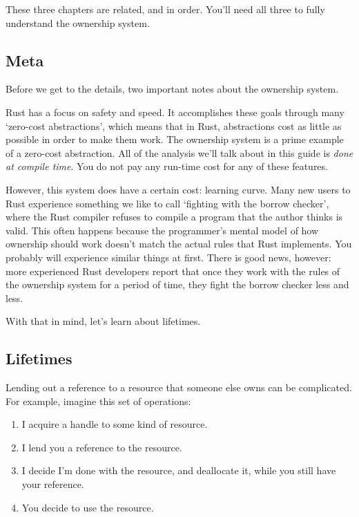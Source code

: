 \documentclass[a4paper,]{book}
\providecommand{\tightlist}{%
  \setlength{\itemsep}{0pt}\setlength{\parskip}{0pt}}
\begin{document}
These three chapters are related, and in order. You'll need all three to
fully understand the ownership system.

\subsection{Meta}\label{meta-2}

Before we get to the details, two important notes about the ownership
system.

Rust has a focus on safety and speed. It accomplishes these goals
through many `zero-cost abstractions', which means that in Rust,
abstractions cost as little as possible in order to make them work. The
ownership system is a prime example of a zero-cost abstraction. All of
the analysis we'll talk about in this guide is \emph{done at compile
time}. You do not pay any run-time cost for any of these features.

However, this system does have a certain cost: learning curve. Many new
users to Rust experience something we like to call `fighting with the
borrow checker', where the Rust compiler refuses to compile a program
that the author thinks is valid. This often happens because the
programmer's mental model of how ownership should work doesn't match the
actual rules that Rust implements. You probably will experience similar
things at first. There is good news, however: more experienced Rust
developers report that once they work with the rules of the ownership
system for a period of time, they fight the borrow checker less and
less.

With that in mind, let's learn about lifetimes.

\hypertarget{lifetimes}{\subsection{Lifetimes}\label{lifetimes}}

Lending out a reference to a resource that someone else owns can be
complicated. For example, imagine this set of operations:

\begin{enumerate}
\def\labelenumi{\arabic{enumi}.}
\tightlist
\item
  I acquire a handle to some kind of resource.
\item
  I lend you a reference to the resource.
\item
  I decide I'm done with the resource, and deallocate it, while you
  still have your reference.
\item
  You decide to use the resource.
\end{enumerate}
\end{document}
